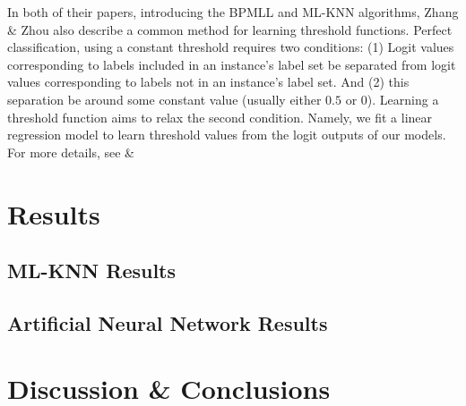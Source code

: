 \documentclass[11pt]{article}
\begin{document}
In both of their papers, introducing the BPMLL and ML-KNN algorithms, Zhang \& Zhou also describe a common method for learning threshold functions. Perfect classification, using a constant threshold requires two conditions: (1) Logit values corresponding to labels included in an instance's label set  be separated from logit values corresponding to labels not in an instance's label set. And (2) this separation be around some constant value (usually either $0.5$ or $0$). Learning a threshold function aims to relax the second condition. Namely, we fit a linear regression model to learn threshold values from the logit outputs of our models. For more details, see \autocite{bpmll} \& \autocite{mlknn} 
\section{Results}

\subsection{ML-KNN Results}

\subsection{Artificial Neural Network Results}

\section{Discussion \& Conclusions}

\newpage
\printbibliography
\end{document}
